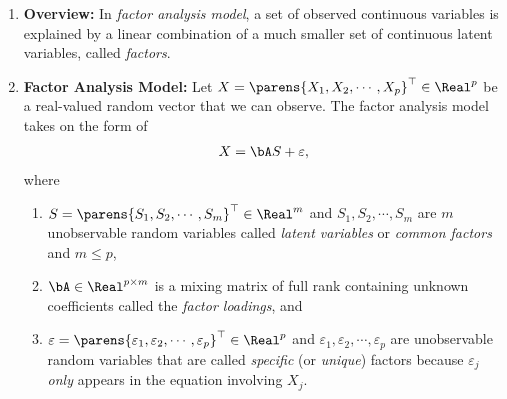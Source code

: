 \documentclass[12pt]{article}
\begin{document}
\begin{enumerate}[label=\textbf{\arabic*.}]

	\item \textbf{Overview:} In \textit{factor analysis model}, a set of observed continuous variables is explained by a linear combination of a much smaller set of continuous latent variables, called \textit{factors}. 
	
%	
%
	
	\item \textbf{Factor Analysis Model:} Let $X = \parens{X_1, X_2, \cdots, X_p}^\top \in \Real^p$ be a real-valued random vector that we can observe. The factor analysis model takes on the form of 
	\begin{align}\label{eq-factor-model}
		X = \bA S + \varepsilon, 
	\end{align}
	where 
	\begin{enumerate}
		\item $S = \parens{S_1, S_2, \cdots, S_m}^\top \in \Real^m$ and $S_1, S_2, \cdots, S_m$ are $m$ unobservable random variables called \emph{latent variables} or \emph{common factors} and $m \le p$, 
		\item $\bA \in \Real^{p \times m}$ is a mixing matrix of full rank containing unknown coefficients called the \emph{factor loadings}, and 
		\item $\varepsilon = \parens{\varepsilon_1, \varepsilon_2, \cdots, \varepsilon_p}^\top \in \Real^p$ and $\varepsilon_1, \varepsilon_2, \cdots, \varepsilon_p$ are unobservable random variables that are called \emph{specific} (or \emph{unique}) factors because $\varepsilon_j$ \emph{only} appears in the equation involving $X_j$. 
	\end{enumerate}
	

\end{enumerate}
\end{document}
